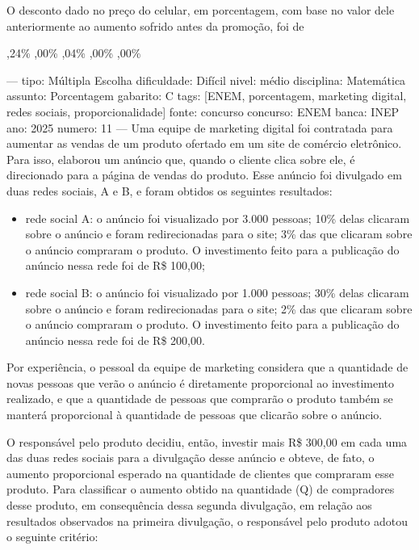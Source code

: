 O desconto dado no preço do celular, em porcentagem, com base no valor dele anteriormente ao aumento sofrido antes da promoção, foi de
\begin{choices}
,24\%
,00\%
,04\%
,00\%
,00\%
\end{choices}

---
tipo: Múltipla Escolha
dificuldade: Difícil
nivel: médio
disciplina: Matemática
assunto: Porcentagem
gabarito: C
tags: [ENEM, porcentagem, marketing digital, redes sociais, proporcionalidade]
fonte: concurso
concurso: ENEM
banca: INEP
ano: 2025
numero: 11
---
\question
Uma equipe de marketing digital foi contratada para aumentar as vendas de um produto ofertado em um site de comércio eletrônico. Para isso, elaborou um anúncio que, quando o cliente clica sobre ele, é direcionado para a página de vendas do produto. Esse anúncio foi divulgado em duas redes sociais, A e B, e foram obtidos os seguintes resultados:

\begin{itemize}
\item rede social A: o anúncio foi visualizado por 3.000 pessoas; 10\% delas clicaram sobre o anúncio e foram redirecionadas para o site; 3\% das que clicaram sobre o anúncio compraram o produto. O investimento feito para a publicação do anúncio nessa rede foi de R\$ 100,00;
\item rede social B: o anúncio foi visualizado por 1.000 pessoas; 30\% delas clicaram sobre o anúncio e foram redirecionadas para o site; 2\% das que clicaram sobre o anúncio compraram o produto. O investimento feito para a publicação do anúncio nessa rede foi de R\$ 200,00.
\end{itemize}

Por experiência, o pessoal da equipe de marketing considera que a quantidade de novas pessoas que verão o anúncio é diretamente proporcional ao investimento realizado, e que a quantidade de pessoas que comprarão o produto também se manterá proporcional à quantidade de pessoas que clicarão sobre o anúncio.

O responsável pelo produto decidiu, então, investir mais R\$ 300,00 em cada uma das duas redes sociais para a divulgação desse anúncio e obteve, de fato, o aumento proporcional esperado na quantidade de clientes que compraram esse produto. Para classificar o aumento obtido na quantidade (Q) de compradores desse produto, em consequência dessa segunda divulgação, em relação aos resultados observados na primeira divulgação, o responsável pelo produto adotou o seguinte critério:

